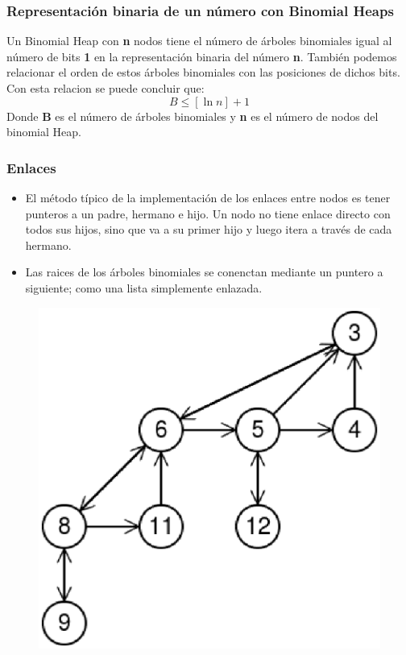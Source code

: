 \documentclass{beamer}
\begin{document}
\begin{frame}
 \frametitle{Representación binaria de un número con Binomial Heaps}
 Un Binomial Heap con \textbf{n} nodos tiene el número de árboles binomiales
 igual al número de bits \textbf{1} en la representación binaria del número \textbf{n}.
 También podemos relacionar el orden de estos árboles binomiales con las posiciones de
 dichos bits.
 Con esta relacion se puede concluir que: $$B \leq [\ln n] + 1$$
 Donde \textbf{B} es el número de árboles binomiales y \textbf{n} es el número de nodos del binomial Heap. 
\end{frame}

\begin{frame}
 \frametitle{Enlaces}
 \begin{itemize}
 \item El método típico de la implementación de los enlaces entre nodos es tener punteros a
 un padre, hermano e hijo. Un nodo no tiene enlace directo con todos sus hijos,
 sino que va a su primer hijo y luego itera a través de cada hermano.
 \item Las raices de los árboles binomiales se conenctan mediante un puntero a siguiente;
 como una lista simplemente enlazada.
 \end{itemize}
  \begin{figure}
   \centering
   \includegraphics[scale = 0.4]{3.eps}
  \end{figure}
\end{frame}
\end{document}
